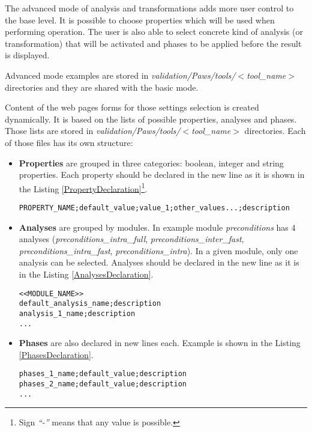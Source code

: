 The advanced mode of analysis and transformations adds more user control to the base level. It is possible to choose properties which will be used when performing operation. The user is also able to select concrete kind of analysis (or transformation) that will be activated and phases to be applied before the result is displayed. 

Advanced mode examples are stored in \emph{validation/Paws/tools/$<$tool\_name$>$} directories and they are shared with the basic mode.

Content of the web pages forms for those settings selection is created dynamically. It is based on the lists of possible properties, analyses and phases. Those lists are stored in \emph{validation/Paws/tools/$<$tool\_name$>$} directories. Each of those files has its own structure:

\begin{itemize}

  \item {\bf Properties} are grouped in three categories: boolean, integer and string properties. Each property should be declared in the new line as it is shown in the Listing \ref{PropertyDeclaration}\footnote{Sign \emph{``-''} means that any value is possible.}.
  
\begin{lstlisting}
PROPERTY_NAME;default_value;value_1;other_values...;description
\end{lstlisting}

  \item {\bf Analyses} are grouped by modules. In example module \emph{preconditions} has 4 analyses (\emph{preconditions\_intra\_full}, \emph{preconditions\_inter\_fast}, \emph{preconditions\_intra\_fast}, \emph{preconditions\_intra}). In a given module, only one analysis can be selected. Analyses should be declared in the new line as it is in the Listing \ref{AnalysesDeclaration}.
  
\begin{lstlisting}
<<MODULE_NAME>>
default_analysis_name;description
analysis_1_name;description
...
\end{lstlisting}
  
  \item {\bf Phases} are also declared in new lines each. Example is shown in the Listing \ref{PhasesDeclaration}.
  
\begin{lstlisting}
phases_1_name;default_value;description
phases_2_name;default_value;description
...
\end{lstlisting}

\end{itemize}

